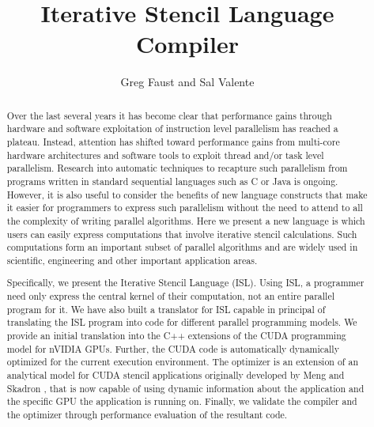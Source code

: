 \documentclass{styles/sig-alternate}
\begin{document}
\title{Iterative Stencil Language Compiler}
\author{
\alignauthor Greg Faust and Sal Valente\\
}
\maketitle

\begin{abstract}

Over the last several years it has become clear that performance gains through hardware and 
software exploitation of instruction level parallelism has reached a plateau.  
Instead, attention has shifted toward performance gains from multi-core hardware 
architectures and software tools to exploit thread and/or task level parallelism.  
Research into automatic techniques to recapture such parallelism from programs written 
in standard sequential languages such as C or Java is ongoing.  However, it is also useful 
to consider the benefits of new language constructs that make it easier for programmers 
to express such parallelism without the need to attend to all the complexity of 
writing parallel algorithms.  Here we present a new language is which users can easily 
express computations that involve iterative stencil calculations.  
Such computations form an important subset of parallel algorithms and are 
widely used in scientific, engineering and other important application areas.


Specifically, we present the Iterative Stencil Language (ISL).  
Using ISL, a programmer need only express the central kernel of their 
computation, not an entire parallel program for it.  We have also built a 
translator for ISL capable in principal of translating the ISL program into code for 
different parallel programming models.  
We provide an initial translation into the C++ extensions of the CUDA programming 
model for nVIDIA GPUs.  Further, the CUDA code is automatically dynamically optimized 
for the current execution environment.  The optimizer is an extension of an analytical 
model for CUDA stencil applications originally developed by Meng and Skadron \cite{meng}, 
that is now capable of using dynamic information about the application and the specific 
GPU the application is running on.  
Finally, we validate the compiler and the optimizer through performance evaluation of the resultant code.

\end{abstract}
\end{document}
